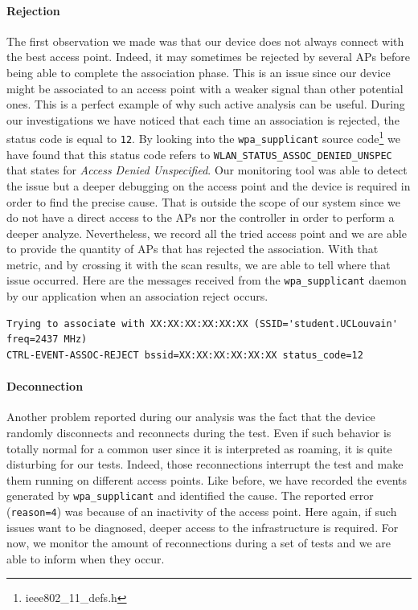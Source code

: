\paragraph*{Rejection} The first observation we made was that our device does not always connect with the best access point. Indeed, it may sometimes be rejected by several APs before being able to complete the association phase. This is an issue since our device might be associated to an access point with a weaker signal than other potential ones. This is a perfect example of why such active analysis can be useful. During our investigations we have noticed that each time an association is rejected, the status code is equal to \texttt{12}. By looking into the \texttt{wpa\_supplicant} source code\footnote{ieee802\_11\_defs.h} we have found that this status code refers to \texttt{WLAN\_STATUS\_ASSOC\_DENIED\_UNSPEC} that states for \emph{Access Denied Unspecified}. Our monitoring tool was able to detect the issue but a deeper debugging on the access point and the device is required in order to find the precise cause. That is outside the scope of our system since we do not have a direct access to the APs nor the controller in order to perform a deeper analyze. Nevertheless, we record all the tried access point and we are able to provide the quantity of APs that has rejected the association. With that metric, and by crossing it with the scan results, we are able to tell where that issue occurred. Here are the messages received from the \texttt{wpa\_supplicant} daemon by our application when an association reject occurs.\\

\begin{lstlisting}[frame=single,breaklines=true,caption={Exemple of rejection}]
Trying to associate with XX:XX:XX:XX:XX:XX (SSID='student.UCLouvain' freq=2437 MHz)
CTRL-EVENT-ASSOC-REJECT bssid=XX:XX:XX:XX:XX:XX status_code=12
\end{lstlisting}

\paragraph*{Deconnection} Another problem reported during our analysis was the fact that the device randomly disconnects and reconnects during the test. Even if such behavior is totally normal for a common user since it is interpreted as roaming, it is quite disturbing for our tests. Indeed, those reconnections interrupt the test and make them running on different access points. Like before, we have recorded the events generated by \texttt{wpa\_supplicant} and identified the cause. The reported error (\texttt{reason=4}) was because of an inactivity of the access point. Here again, if such issues want to be diagnosed, deeper access to the infrastructure is required. For now, we monitor the amount of reconnections during a set of tests and we are able to inform when they occur.\\

